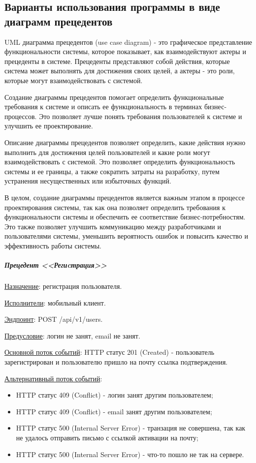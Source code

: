 \subsection*{Варианты использования программы в виде диаграмм прецедентов}

UML диаграмма прецедентов (use case diagram) - это графическое представление функциональности системы, которое показывает,
как взаимодействуют актеры и прецеденты в системе.
Прецеденты представляют собой действия, которые система может выполнять для достижения своих целей,
а актеры - это роли, которые могут взаимодействовать с системой.

Создание диаграммы прецедентов помогает определить функциональные требования к системе и описать ее функциональность в терминах бизнес-процессов.
Это позволяет лучше понять требования пользователей к системе и улучшить ее проектирование.

Описание диаграммы прецедентов позволяет определить, какие действия нужно выполнить для достижения целей пользователей
и какие роли могут взаимодействовать с системой. Это позволяет определить функциональность системы и ее границы,
а также сократить затраты на разработку, путем устранения несущественных или избыточных функций.

В целом, создание диаграммы прецедентов является важным этапом в процессе проектирования системы,
так как она позволяет определить требования к функциональности системы и обеспечить ее соответствие бизнес-потребностям.
Это также позволяет улучшить коммуникацию между разработчиками и пользователями системы, уменьшить вероятность ошибок и повысить качество и эффективность работы системы.


\subparagraph{Прецедент <<Региcтрация>>} \hspace{0pt}

\underline{Назначение}: регистрация пользователя.

\underline{Исполнители}: мобильный клиент.

\underline{Эндпоинт}: POST /api/v1/users.

\underline{Предусловие}: логин не занят, email не занят.

\underline{Основной поток событий}: HTTP статус 201 (Created) - пользователь зарегистрирован и пользователю пришло на почту ссылка подтверждения.

\underline{Альтернативный поток событий}:

\begin{itemize}
    \item HTTP статус 409 (Conflict) - логин занят другим пользователем;
    \item HTTP статус 409 (Conflict) - email занят другим пользователем;
    \item HTTP статус 500 (Internal Server Error) - транзация не совершена, так как не удалось отправить письмо с ссылкой активации на почту;
    \item HTTP статус 500 (Internal Server Error) - что-то пошло не так на сервере.
\end{itemize}

